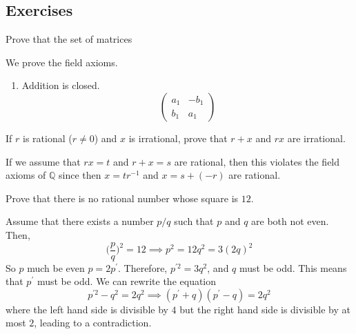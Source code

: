 \documentclass{article}
\begin{document}
  \subsection{Exercises} 

    \begin{exercise}
      Prove that the set of matrices 
    \end{exercise}
    \begin{solution}
      We prove the field axioms.
      \begin{enumerate}
        \item Addition is closed. 
        \begin{equation} 
          \begin{pmatrix}
            a_1 & -b_1 \\ b_1 & a_1
          \end{pmatrix}
        \end{equation}
      \end{enumerate}
    \end{solution}

    \begin{exercise}
      
    \end{exercise}

    \begin{exercise}
      
    \end{exercise}

    \begin{exercise}
      
    \end{exercise}

    \begin{exercise}[Rudin 1.1]
      If $r$ is rational ($r \neq 0$) and $x$ is irrational, prove that $r + x$ and $rx$ are irrational. 
    \end{exercise}
    \begin{solution}
      If we assume that $r x = t$ and $r + x = s$ are rational, then this violates the field axioms of $\mathbb{Q}$ since then $x = t r^{-1}$ and $x = s + (-r)$ are rational. 
    \end{solution}

    \begin{exercise}[Rudin 1.2]
    Prove that there is no rational number whose square is $12$. 
    \end{exercise}
    \begin{solution}
    Assume that there exists a number $p/q$ such that $p$ and $q$ are both not even. Then, 
    \[\bigg( \frac{p}{q} \bigg)^2 = 12 \implies p^2 = 12q^2 = 3 (2 q)^2\]
    So $p$ much be even $p = 2 p^\prime$. Therefore, $p^{\prime 2} = 3 q^2$, and $q$ must be odd. This means that $p^\prime$ must be odd. We can rewrite the equation 
    \[p^{\prime 2} - q^2 = 2 q^2 \implies (p^\prime + q) (p^\prime - q) = 2q^2\]
    where the left hand side is divisible by $4$ but the right hand side is divisible by at most $2$, leading to a contradiction. 
    \end{solution}
\end{document}
